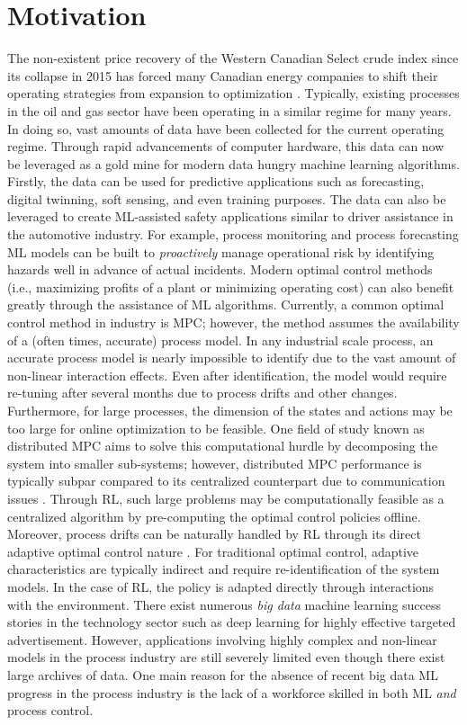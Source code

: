 \section{Motivation}
The non-existent price recovery of the Western Canadian Select crude index since its collapse in 2015 has forced many Canadian energy companies to shift their operating strategies from expansion to optimization \cite{oil_price}.  Typically, existing processes in the oil and gas sector have been operating in a similar regime for many years.  In doing so, vast amounts of data have been collected for the current operating regime.  Through rapid advancements of computer hardware, this data can now be leveraged as a gold mine for modern data hungry machine learning algorithms.  Firstly, the data can be used for predictive applications such as forecasting, digital twinning, soft sensing, and even training purposes.  The data can also be leveraged to create ML-assisted safety applications similar to driver assistance in the automotive industry. For example, process monitoring and process forecasting ML models can be built to \textit{proactively} manage operational risk by identifying hazards well in advance of actual incidents. Modern optimal control methods (i.e., maximizing profits of a plant or minimizing operating cost) can also benefit greatly through the assistance of ML algorithms.  Currently, a common optimal control method in industry is MPC; however, the method assumes the availability of a (often times, accurate) process model.  In any industrial scale process, an accurate process model is nearly impossible to identify due to the vast amount of non-linear interaction effects.  Even after identification, the model would require re-tuning after several months due to process drifts and other changes. Furthermore, for large processes, the dimension of the states and actions may be too large for online optimization to be feasible. One field of study known as distributed MPC aims to solve this computational hurdle by decomposing the system into smaller sub-systems; however, distributed MPC performance is typically subpar compared to its centralized counterpart due to communication issues \cite{distributed_mpc}. Through RL, such large problems may be computationally feasible as a centralized algorithm by pre-computing the optimal control policies offline. Moreover, process drifts can be naturally handled by RL through its direct adaptive optimal control nature \cite{direct_adaptive}.  For traditional optimal control, adaptive characteristics are typically indirect and require re-identification of the system models.  In the case of RL, the policy is adapted directly through interactions with the environment. There exist numerous \textit{big data} machine learning success stories in the technology sector such as deep learning for highly effective targeted advertisement. However, applications involving highly complex and non-linear models in the process industry are still severely limited even though there exist large archives of data. One main reason for the absence of recent big data ML progress in the process industry is the lack of a workforce skilled in both ML \textit{and} process control.

